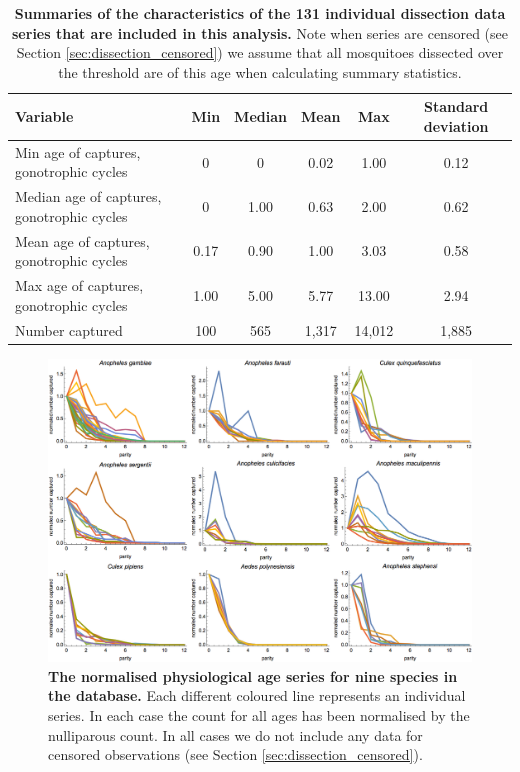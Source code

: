 \documentclass[12pt]{article}
\begin{document}
{\begin{table}[htbp]
	\centering
	\footnotesize
	\begin{adjustwidth}{-0.5in}{-0.5in}%
		\begin{tabularx}{1.25\textwidth}{l|ccccc}
			\toprule
			\textbf{Variable} & \textbf{Min} & \textbf{Median} & \textbf{Mean} & \textbf{Max} & \textbf{Standard deviation} \\
			\midrule
			Min age of captures, gonotrophic cycles & 0  & 0  & 0.02  & 1.00  & 0.12 \\
			Median age of captures, gonotrophic cycles & 0  & 1.00  & 0.63  & 2.00  & 0.62 \\
			Mean age of captures, gonotrophic cycles & 0.17  & 0.90  & 1.00  & 3.03  & 0.58 \\
			Max age of captures, gonotrophic cycles & 1.00  & 5.00  & 5.77  & 13.00 & 2.94 \\
			Number captured & 100 & 565 & 1,317 & 14,012 & 1,885 \\
			\bottomrule
		\end{tabularx}%
	\end{adjustwidth}
	\caption{\textbf{Summaries of the characteristics of the 131 individual dissection data series that are included in this analysis.} Note when series are censored (see Section \ref{sec:dissection_censored}) we assume that all mosquitoes dissected over the threshold are of this age when calculating summary statistics.}\label{tab:dissection_summaryStats}
\end{table}

\begin{figure}[ht]
	\centerline{\includegraphics[width=1.3\textwidth]{./Figure_files/dissection_parity_data1.png}}
	\caption{\textbf{The normalised physiological age series for nine species in the database.} Each different coloured line represents an individual series. In each case the count for all ages has been normalised by the nulliparous count. In all cases we do not include any data for censored observations (see Section \ref{sec:dissection_censored}).}\label{fig:dissection_exampleData1}
\end{figure}

}
\end{document}
